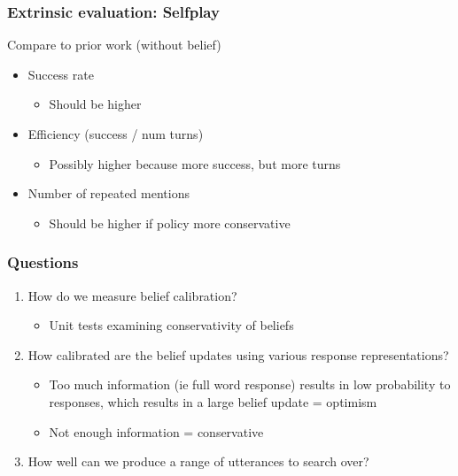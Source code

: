 \documentclass{beamer}
\begin{document}
\begin{frame}
\frametitle{Extrinsic evaluation: Selfplay}
Compare to prior work (without belief)
\begin{itemize}
\item Success rate
    \begin{itemize}
    \item Should be higher
    \end{itemize}
\item Efficiency (success / num turns)
    \begin{itemize}
    \item Possibly higher because more success, but more turns
    \end{itemize}
\item Number of repeated mentions
    \begin{itemize}
    \item Should be higher if policy more conservative
    \end{itemize}
\end{itemize}
\end{frame}

\begin{frame}
\frametitle{Questions}
\begin{enumerate}
\item How do we measure belief calibration?
    \begin{itemize}
    \item Unit tests examining conservativity of beliefs
    \end{itemize}
\item How calibrated are the belief updates using various response representations?
    \begin{itemize}
    \item Too much information (ie full word response) results in low probability
        to responses, which results in a large belief update = optimism
    \item Not enough information = conservative
    \end{itemize}
\item How well can we produce a range of utterances to search over?
\end{enumerate}
\end{frame}
\end{document}
